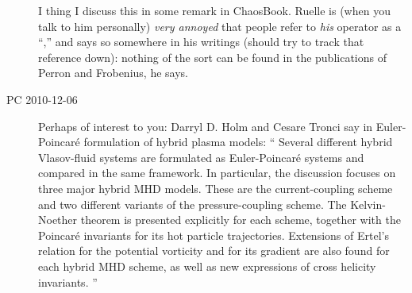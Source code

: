 \begin{description}
I thing I discuss this in some remark in ChaosBook. Ruelle is (when you
talk to him personally) \emph{very annoyed} that people refer to \emph{his}
operator as a ``\FPoper,'' and says so somewhere in his writings (should try to
track that reference down): nothing
of the sort can be found in the publications of Perron and Frobenius,
he says.

\item[PC 2010-12-06] Perhaps of interest to you:
Darryl D. Holm and  Cesare Tronci say in
{Euler-Poincar\'e formulation of hybrid plasma models}:
``
 Several different hybrid Vlasov-fluid systems are formulated as
Euler-Poincar\'e systems and compared in the same framework. In particular, the
discussion focuses on three major hybrid MHD models. These are the
current-coupling scheme and two different variants of the pressure-coupling
scheme. The Kelvin-Noether theorem is presented explicitly for each scheme,
together with the Poincar\'e invariants for its hot particle trajectories.
Extensions of Ertel's relation for the potential vorticity and for its gradient
are also found for each hybrid MHD scheme, as well as new expressions of cross
helicity invariants.
''

\end{description}
